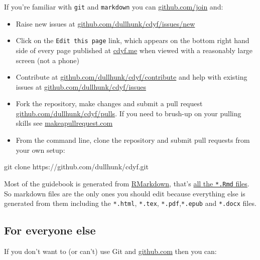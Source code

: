 \documentclass[
]{book}
\newenvironment{Shaded}{\begin{snugshade}}{\end{snugshade}}
\newcommand{\NormalTok}[1]{#1}
\providecommand{\tightlist}{%
  \setlength{\itemsep}{0pt}\setlength{\parskip}{0pt}}
\begin{document}
If you're familiar with \texttt{git} and \texttt{markdown} you can \href{https://github.com/join}{github.com/join} and:

\begin{itemize}
\tightlist
\item
  Raise new issues at \href{https://github.com/dullhunk/cdyf/issues/new}{github.com/dullhunk/cdyf/issues/new}
\item
  Click on the \texttt{Edit\ this\ page} link, which appears on the bottom right hand side of every page published at \href{https://www.cdyf.me}{cdyf.me} when viewed with a reasonably large screen (not a phone)
\item
  Contribute at \href{https://github.com/dullhunk/cdyf/contribute}{github.com/dullhunk/cdyf/contribute} and help with existing issues at \href{https://github.com/dullhunk/cdyf/issues}{github.com/dullhunk/cdyf/issues}
\item
  Fork the repository, make changes and submit a pull request \href{https://github.com/dullhunk/cdyf/pulls}{github.com/dullhunk/cdyf/pulls}. If you need to brush-up on your pulling skills see \href{http://makeapullrequest.com/}{makeapullrequest.com}
\item
  From the command line, clone the repository and submit pull requests from your own setup:
\end{itemize}

\begin{Shaded}
\begin{Highlighting}[]
\NormalTok{git clone https://github.com/dullhunk/cdyf.git}
\end{Highlighting}
\end{Shaded}

Most of the guidebook is generated from \href{https://en.wikipedia.org/wiki/Markdown}{RMarkdown}, that's \href{https://github.com/dullhunk/cdyf/search?l=RMarkdown}{all the \texttt{*.Rmd} files}. So markdown files are the only ones you should edit because everything else is generated from them including the \texttt{*.html}, \texttt{*.tex}, \texttt{*.pdf},\texttt{*.epub} and \texttt{*.docx} files.

\hypertarget{elseif}{%
\subsection{For everyone else}\label{elseif}}

If you don't want to (or can't) use Git and \href{https://github.com/}{github.com} then you can:
\end{document}
